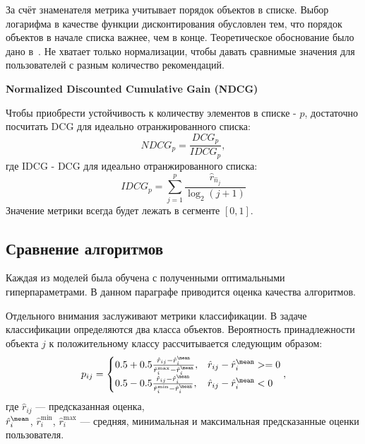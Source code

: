 За счёт знаменателя метрика учитывает порядок объектов в списке.
Выбор логарифма в качестве функции дисконтирования обусловлен тем, что порядок объектов в начале списка важнее, чем в конце.
Теоретическое обоснование было дано в~\cite{dcg-log}.
Не хватает только нормализации, чтобы давать сравнимые значения для пользователей с разным количество рекомендаций.

\vspace{1em}
\textbf{Normalized Discounted Cumulative Gain (NDCG)}

Чтобы приобрести устойчивость к количеству элементов в списке - $p$, достаточно посчитать DCG для идеально отранжированного списка:
\begin{equation}\label{eq:ndcg}
NDCG_p = \frac{DCG_p}{IDCG_p},
\end{equation}
где IDCG - DCG для идеально отранжированного списка:
\begin{equation}\label{eq:idcg}
IDCG_p = \sum_{j=1}^{p}\frac{\hat{r}_{\hat{n}_j}}{\log_2 (j + 1)}
\end{equation}
Значение метрики всегда будет лежать в сегменте $[0,1]$.


\pagebreak
\subsection{Сравнение алгоритмов}\label{subsec:algos_comparison}
Каждая из моделей была обучена с полученными оптимальными гиперпараметрами.
В данном параграфе приводится оценка качества алгоритмов.

Отдельного внимания заслуживают метрики классификации.
В задаче классификации определяются два класса объектов.
Вероятность принадлежности объекта $j$ к положительному классу рассчитывается следующим образом:
\begin{equation}
p_{ij} =
\begin{cases}
    0.5 + 0.5 \frac{\hat{r}_{ij} - \hat{r}_{i}^{\mean}}{\hat{r}_{i}^{\max} - \hat{r}_{i}^{\mean}}, & \hat{r}_{ij} - \hat{r}_{i}^{\mean} >= 0 \\
    0.5 - 0.5 \frac{\hat{r}_{ij} - \hat{r}_{i}^{\mean}}{\hat{r}_{i}^{\min} - \hat{r}_{i}^{\mean}}, & \hat{r}_{ij} - \hat{r}_{i}^{\mean} < 0
\end{cases}\label{eq:class_proba},
\end{equation}
где
$\hat{r}_{ij}$ --- предсказанная оценка, \\
$\hat{r}_{i}^{\mean}$, $\hat{r}_{i}^{\min}$, $\hat{r}_{i}^{\max}$ --- средняя, минимальная и максимальная предсказанные оценки пользователя.

